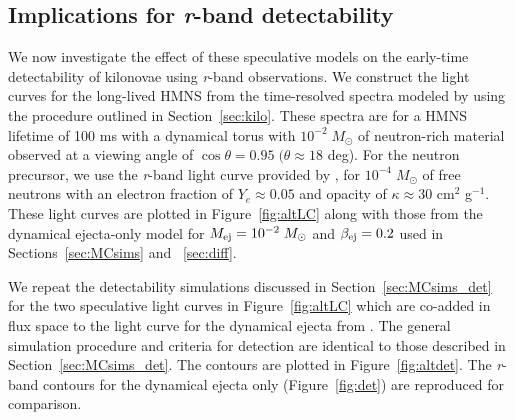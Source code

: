 \subsection{Implications for {\em r}-band detectability}
We now investigate the effect of these speculative models on the early-time detectability of kilonovae using {\em r}-band observations. We construct the light curves for the long-lived HMNS from the time-resolved spectra modeled by \citet{Kasen+15} using the procedure outlined in Section~\ref{sec:kilo}. These spectra are for a HMNS lifetime of 100 ms with a dynamical torus with $10^{-2}\;M_{\odot}$ of neutron-rich material observed at a viewing angle of $\cos{\theta} = 0.95\; (\theta \approx 18$ deg). For the neutron precursor, we use the {\em r}-band light curve provided by \citet{Metzger+15}, for $10^{-4}\;M_{\odot}$ of free neutrons with an electron fraction of $Y_e \approx 0.05$ and opacity of $\kappa \approx 30$ cm$^2$ g$^{-1}$. These light curves are plotted in Figure~\ref{fig:altLC} along with those from the dynamical ejecta-only model for $M_{{\rm ej}} = 10^{-2}\;M_{\odot}$ and $\beta_{{\rm ej}} = 0.2$ used in Sections~\ref{sec:MCsims} and ~\ref{sec:diff}.
   
We repeat the detectability simulations discussed in Section~\ref{sec:MCsims_det} for the two speculative light curves in Figure~\ref{fig:altLC} which are co-added in flux space to the light curve for the dynamical ejecta from \citet{BarnesKasen13}. The general simulation procedure and criteria for detection are identical to those described in Section~\ref{sec:MCsims_det}. The contours are plotted in Figure~\ref{fig:altdet}. The {\em r}-band contours for the dynamical ejecta only (Figure~\ref{fig:det}) are reproduced for comparison. 

